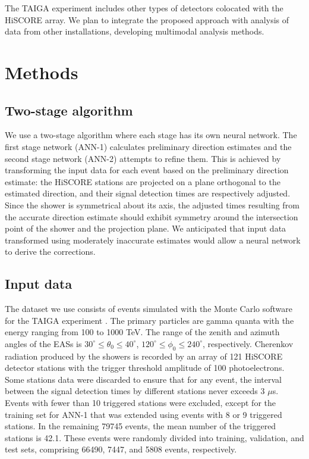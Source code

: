 \documentclass[reprint,
superscriptaddress,
amsmath,amssymb,aps,showkeys,showpacs,
twoside,final,secnumarabic,%
nofootinbib]{revtex4-2}
\begin{document}
The TAIGA experiment includes other types of detectors colocated with the HiSCORE array. We plan to integrate the proposed approach with analysis of data from other installations, developing multimodal analysis methods.


\section{Methods}\label{methods}

\subsection{Two-stage algorithm}
We use a two-stage algorithm where each stage has its own neural network. The first stage network (ANN-1) calculates preliminary direction estimates and the second stage network (ANN-2) attempts to refine them. This is achieved by transforming the input data for each event based on the preliminary direction estimate: the HiSCORE stations are projected on a plane orthogonal to the estimated direction, and their signal detection times are respectively adjusted.
Since the shower is symmetrical about its axis, the adjusted times resulting from the accurate direction estimate should exhibit symmetry around the intersection point of the shower and the projection plane. We anticipated that input data transformed using moderately inaccurate estimates would allow a neural network to derive the corrections.

\subsection{Input data}
The dataset we use consists of events simulated with the Monte Carlo software for the TAIGA experiment \cite{Postnikov19, Grinyuk20}. The primary particles are gamma quanta with the energy ranging from 100 to 1000 TeV. The range of the zenith and azimuth angles of the EASs is $30^\circ \leq \theta_0 \leq 40^\circ$, $120^\circ \leq \phi_0 \leq 240^\circ$, respectively. Cherenkov radiation produced by the showers is recorded by an array of 121 HiSCORE detector stations with the trigger threshold amplitude of 100 photoelectrons. Some stations data were discarded to ensure that for any event, the interval between the signal detection times by different stations never exceeds 3 $\mu$s. Events with fewer than 10 triggered stations were excluded, except for the training set for ANN-1 that was extended using events with 8 or 9 triggered stations. In the remaining 79745 events, the mean number of the triggered stations is 42.1. These events were randomly divided into training, validation, and test sets, comprising 66490, 7447, and 5808 events, respectively.
\end{document}
